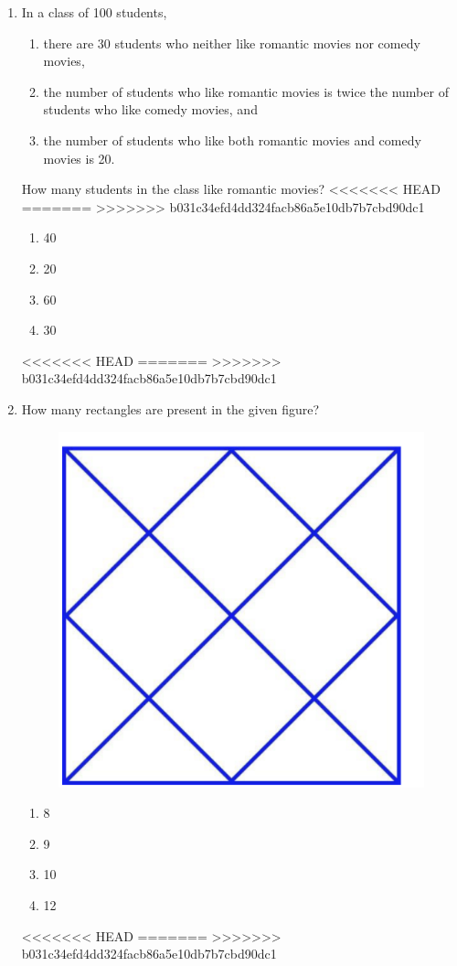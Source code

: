 \documentclass[journal]{IEEEtran}
\begin{document}
\begin{enumerate}
\item 
In a class of 100 students,
\begin{enumerate}
    \item there are 30 students who neither like romantic movies nor comedy movies,
    \item the number of students who like romantic movies is twice the number of students who like comedy movies, and
    \item the number of students who like both romantic movies and comedy movies is 20.
\end{enumerate}

How many students in the class like romantic movies?
<<<<<<< HEAD
\hfill{}
=======
\hfill{}
>>>>>>> b031c34efd4dd324facb86a5e10db7b7cbd90dc1

\begin{enumerate}
    \item 40
    \item 20
    \item 60
    \item 30
\end{enumerate}
<<<<<<< HEAD
\hfill{}
=======
\hfill{}
>>>>>>> b031c34efd4dd324facb86a5e10db7b7cbd90dc1

\newpage
\item  
How many rectangles are present in the given figure?
\begin{figure}[H]
    \centering
    \includegraphics[width=0.4\columnwidth]{Figs/Q5}
    \caption{}
    \label{}
\end{figure}

\begin{enumerate}
    \item 8
    \item 9
    \item 10
    \item 12
\end{enumerate}
<<<<<<< HEAD
\hfill{}
=======
\hfill{}
>>>>>>> b031c34efd4dd324facb86a5e10db7b7cbd90dc1


\end{enumerate}
\end{document}
